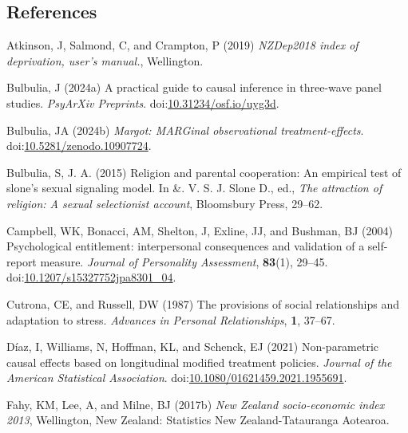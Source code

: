 \documentclass[
  singlecolumn]{article}
\newlength{\cslhangindent}
\newenvironment{CSLReferences}[2] %
 {\begin{list}{}{%
  \setlength{\itemindent}{0pt}
  \setlength{\leftmargin}{0pt}
  \setlength{\parsep}{0pt}
  \ifodd #1
   \setlength{\leftmargin}{\cslhangindent}
   \setlength{\itemindent}{-1\cslhangindent}
  \fi
  \setlength{\itemsep}{#2\baselineskip}}}
 {\end{list}}
\begin{document}
\subsection*{References}\label{references}

\label{refs}
\begin{CSLReferences}{1}{0}
Atkinson, J, Salmond, C, and Crampton, P (2019) \emph{NZDep2018 index of
deprivation, user{'}s manual.}, Wellington.

Bulbulia, J (2024a) A practical guide to causal inference in three-wave
panel studies. \emph{PsyArXiv Preprints}.
doi:\href{https://doi.org/10.31234/osf.io/uyg3d}{10.31234/osf.io/uyg3d}.

Bulbulia, JA (2024b) \emph{Margot: MARGinal observational
treatment-effects}.
doi:\href{https://doi.org/10.5281/zenodo.10907724}{10.5281/zenodo.10907724}.

Bulbulia, S, J. A. (2015) Religion and parental cooperation: An
empirical test of slone's sexual signaling model. In \&. V. S. J. Slone
D., ed., \emph{The attraction of religion: A sexual selectionist
account}, Bloomsbury Press, 29--62.

Campbell, WK, Bonacci, AM, Shelton, J, Exline, JJ, and Bushman, BJ
(2004) Psychological entitlement: interpersonal consequences and
validation of a self-report measure. \emph{Journal of Personality
Assessment}, \textbf{83}(1), 29--45.
doi:\href{https://doi.org/10.1207/s15327752jpa8301_04}{10.1207/s15327752jpa8301\_04}.

Cutrona, CE, and Russell, DW (1987) The provisions of social
relationships and adaptation to stress. \emph{Advances in Personal
Relationships}, \textbf{1}, 37--67.

Díaz, I, Williams, N, Hoffman, KL, and Schenck, EJ (2021) Non-parametric
causal effects based on longitudinal modified treatment policies.
\emph{Journal of the American Statistical Association}.
doi:\href{https://doi.org/10.1080/01621459.2021.1955691}{10.1080/01621459.2021.1955691}.

Fahy, KM, Lee, A, and Milne, BJ (2017b) \emph{New Zealand socio-economic
index 2013}, Wellington, New Zealand: Statistics New Zealand-Tatauranga
Aotearoa.


\end{CSLReferences}
\end{document}
